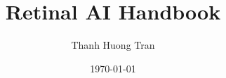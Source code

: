
\usepackage{fontspec}
\usepackage[a4paper,margin=2.8cm]{geometry}

\usepackage[english]{babel}

\usepackage{graphicx}
\usepackage{booktabs}
\usepackage{enumitem}
\usepackage{tabularx}

\usepackage{hyperref}
\usepackage{bookmark}

\title{Retinal AI Handbook}
\author{Thanh Huong Tran}
\date{\today}